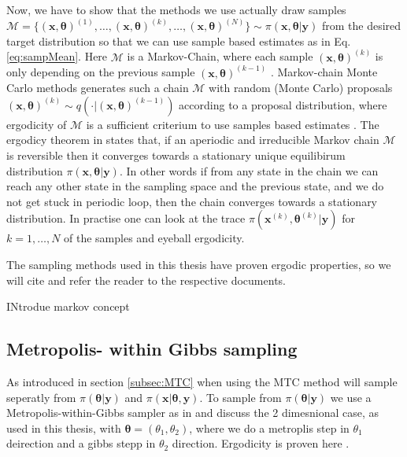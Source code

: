 Now, we have to show that the methods we use actually draw samples $ \mathcal{M} = \{ (\bm{x}, \bm{\theta} )^{(1)}, \dots, (\bm{x}, \bm{\theta} )^{(k)} , \dots,  (\bm{x}, \bm{\theta})^{(N)} \} \sim \pi(\bm{x},\bm{\theta}| \bm{y}) $ from the desired target distribution so that we can use sample based estimates as in Eq. \ref{eq:sampMean}.
Here $ \mathcal{M}$ is a Markov-Chain, where each sample $ (\bm{x}, \bm{\theta})^{(k)}$ is only depending on the previous sample  $ (\bm{x}, \bm{\theta})^{(k-1)}$ \cite{}.
Markov-chain Monte Carlo methods generates such a chain $\mathcal{M}$ with random (Monte Carlo) proposals $(\bm{x}, \bm{\theta})^{(k)} \sim q( \cdot |(\bm{x}, \bm{\theta})^{(k-1)})$ according to a proposal distribution, where ergodicity of $\mathcal{M}$ is a sufficient criterium to use samples based estimates \cite{tan2016LecNot, roberts2004general}.
The ergodicy theorem in \cite{tan2016LecNot} states that, if an aperiodic and irreducible Markov chain $\mathcal{M}$ is reversible then it converges towards a stationary unique equilibirum distribution $\pi(\bm{x},\bm{\theta}| \bm{y}) $.
In other words if from any state in the chain we can reach any other state in the sampling space and the previous state, and we do not get stuck in periodic loop, then the chain converges towards a stationary distribution.
In practise one can look at the trace $\pi(\bm{x}^{(k)},\bm{\theta}^{(k)}| \bm{y}) $ for $k = 1, \dots, N$ of the samples and eyeball ergodicity.

The sampling methods used in this thesis have proven ergodic properties, so we will cite and refer the reader to the respective documents.

INtrodue markov concept

\subsection{Metropolis- within Gibbs sampling}

As introduced in section \ref{subsec:MTC} when using the MTC method will sample seperatly from $\pi(\bm{\theta}| \bm{y})$ and $\pi(\bm{x}|\bm{\theta}, \bm{y}) $.
To sample from $\pi(\bm{\theta}| \bm{y})$ we use a Metropolis-within-Gibbs sampler as in \cite{fox2016fast} and discuss the 2 dimesnional case, as used in this thesis, with $\bm{\theta}  =( \theta_1 , \theta_2) $, where we do a metroplis step in $\theta_1$ deirection and a gibbs stepp in $\theta_2$ direction.
Ergodicity is proven here \cite{roberts2006harris}.


